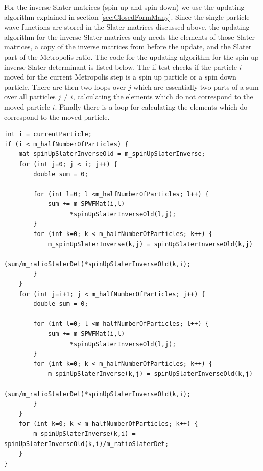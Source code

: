 \documentclass[../main.tex]{subfiles}
\begin{document}
For the inverse Slater matrices (spin up and spin down) we use the updating algorithm explained in section \ref{sec:ClosedFormMany}. Since the single particle wave functions are stored in the Slater matrices discussed above, the updating algorithm for the inverse Slater matrices only needs the elements of those Slater matrices, a copy of the inverse matrices from before the update, and the Slater part of the Metropolis ratio. The code for the updating algorithm for the spin up inverse Slater determinant is listed below. The if-test checks if the particle $i$ moved for the current Metropolis step is a spin up particle or a spin down particle. There are then two loops over $j$ which are essentially two parts of a sum over all particles $j \neq i$, calculating the elements which do not correspond to the moved particle $i$. Finally there is a loop for calculating the elements which do correspond to the moved particle.
\lstset{language=c++}
\begin{lstlisting}[caption={Updating algorithm for the spin up inverse Slater matrix. $i$ is the particle moved at the current Metropolis step, and the if-test checks if that particle has spin up. There are three loops for updating all of the elements, two of which update the $j \neq i$ elements, while the final loop updates the elements where $j = i$. We need at least two loops here since the elements are updated differently depending on whether $j = i$ or not. We split the $j \neq i$ loop into two loops, as seen here, in order to avoid needing an "if $j \neq i$"-test inside the loop (which would slow down the program). Instead we have one loop for all $j < i$ and one for all $j > i$.}]
int i = currentParticle;
if (i < m_halfNumberOfParticles) {
    mat spinUpSlaterInverseOld = m_spinUpSlaterInverse;
    for (int j=0; j < i; j++) {
        double sum = 0;

        for (int l=0; l <m_halfNumberOfParticles; l++) {
            sum += m_SPWFMat(i,l)
                  *spinUpSlaterInverseOld(l,j);
        }
        for (int k=0; k < m_halfNumberOfParticles; k++) {
            m_spinUpSlaterInverse(k,j) = spinUpSlaterInverseOld(k,j)
                                        -(sum/m_ratioSlaterDet)*spinUpSlaterInverseOld(k,i);
        }
    }
    for (int j=i+1; j < m_halfNumberOfParticles; j++) {
        double sum = 0;

        for (int l=0; l <m_halfNumberOfParticles; l++) {
            sum += m_SPWFMat(i,l)
                  *spinUpSlaterInverseOld(l,j);
        }
        for (int k=0; k < m_halfNumberOfParticles; k++) {
            m_spinUpSlaterInverse(k,j) = spinUpSlaterInverseOld(k,j)
                                        -(sum/m_ratioSlaterDet)*spinUpSlaterInverseOld(k,i);
        }
    }
    for (int k=0; k < m_halfNumberOfParticles; k++) {
        m_spinUpSlaterInverse(k,i) = spinUpSlaterInverseOld(k,i)/m_ratioSlaterDet;
    }
}
\end{lstlisting}
\end{document}
